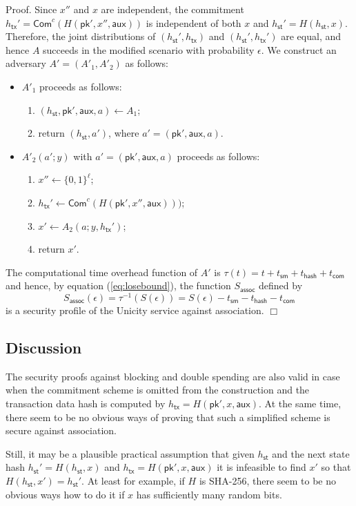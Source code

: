 \documentclass{article}
\newenvironment{proof}{\textsf{Proof}.}{\hfill$\Box$}
\newcommand{\pubkey}[0]{\mathsf{pk}}
\newcommand{\commitc}[0]{\mathsf{Com}^{c}}
\newcommand{\sthash}[0]{h_\mathsf{st}}
\newcommand{\txhash}[0]{h_\mathsf{tx}}
\newcommand{\auxd}[0]{\mathsf{aux}}
\begin{document}
\begin{proof}
Since $x''$ and $x$ are independent, the commitment $\txhash'=\commitc(H(\pubkey',x'',\auxd))$ is independent of both $x$ and $\sthash'=H(\sthash,x)$. Therefore, the joint distributions of $(\sthash',\txhash)$ and $(\sthash',\txhash')$ are equal, and hence $A$ succeeds in the modified scenario with probability $\epsilon$. We construct an adversary $A'=(A'_1,A'_2)$ as follows:
\begin{itemize}
\item $A'_1$ proceeds as follows:
\begin{enumerate}
\item $(\sthash, \pubkey', \auxd, a)\gets A_1$;
\item return $(\sthash, a')$, where $a'=(\pubkey', \auxd, a)$.
\end{enumerate}
\item $A'_2(a';y)$ with $a'=(\pubkey', \auxd, a)$ proceeds as follows:
\begin{enumerate}
\item $x''\gets \{0,1\}^\ell$;
\item $\txhash'\gets\commitc(H(\pubkey',x'',\auxd)))$;
\item $x'\gets A_2(a; y,\txhash')$;
\item return $x'$.
\end{enumerate}
\end{itemize}

\noindent The computational time overhead function of $A'$ is $\tau(t) = t + t_\mathsf{sm} + t_\mathsf{hash} + t_\mathsf{com}$ and hence, by equation (\ref{eq:losebound}), the function $S_\mathsf{assoc}$ defined by
\[
S_\mathsf{assoc}(\epsilon) = \tau^{-1}(S(\epsilon)) = S(\epsilon) - t_\mathsf{sm} - t_\mathsf{hash} - t_\mathsf{com}
\]
is a security profile of the Unicity service against association.
\end{proof}

\subsection{Discussion}

The security proofs against blocking and double spending are also valid in case when the commitment scheme is omitted from the construction and the transaction data hash is computed by $\txhash = H(\pubkey',x,\auxd)$.
At the same time, there seem to be no obvious ways of proving that such a simplified scheme is secure against association.

Still, it may be a plausible practical assumption that given $\sthash$ and the next state hash $\sthash'=H(\sthash,x)$ and $\txhash = H(\pubkey',x,\auxd)$ it is infeasible to find $x'$ so that $H(\sthash,x')=\sthash'$. At least for example, if $H$ is \textsf{SHA-256}, there seem to be no obvious ways how to do it if $x$ has sufficiently many random bits.
\end{document}
